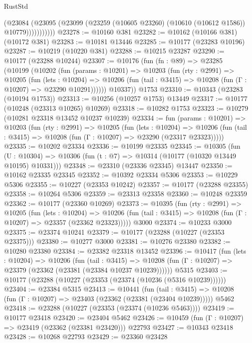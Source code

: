 \begin{lexlean}{RustStd}
\begin{coremodule}
                  (@23084
                    (@23095
                      (@23099 (@23259 (@10605 @23260) (@10610 (@10612 @1586)) @10779)))))))))))
@23278 := @10160 @381
@23282 := @10162 (@10166 @381) (@10172 @381)
@23283 := @10181 @13446
@23285 := @10177 (@23283 @10196)
@23287 := @10219 (@10220 @381)
@23288 := @10215 @23287
@23290 := @10177 (@23288 @10244)
@23307 := @10176
    (fun (fn : @89) =>
    @23285
      (@10199
        (@10202
          (fun (params : @10201) =>
          @10203
            (fun (rty : @2991) =>
            @10205
              (fun (lets : @10204) =>
              @10206 (fun (tail : @3415) => @10208 (fun (Γ : @10207) => @23290 @10291))))))
        @10337))
    @1753
@23310 := @10343 (@23283 (@10194 @1753))
@23313 := @10256 (@10257 @1753) @13449
@23317 := @10177 (@10248 (@23313 @10265) @10269)
@23318 := @10282 @1753
@23323 := @10279 (@10281 @23318 @13452 @10237 @10239)
@23334 := fun (params : @10201) =>
  @10203
    (fun (rty : @2991) =>
    @10205
      (fun (lets : @10204) =>
      @10206 (fun (tail : @3415) => @10208 (fun (Γ : @10207) => @23290 (@23317 @23323)))))
@23335 := @10202 @23334
@23336 := @10199 @23335
@23345 := @10305
    (fun (U : @10304) => @10306 (fun (t : @7) => @10314 (@10177 (@10320 @13449 @10195) @10331)))
@23348 := @23310 (@23336 @23345) @13447
@23350 := @10162 @23335 @23345
@23352 := @10392 @23334 @5306
@23353 := @10229 @5306
@23355 := @10227 (@23353 @10242)
@23357 := @10177 (@23288 @23355)
@23358 := @10264 @5306
@23359 := @23313 @23358
@23360 := @10248 @23359
@23362 := @10177 (@23360 @10269)
@23373 := @10395
    (fun (rty : @2991) =>
    @10205
      (fun (lets : @10204) =>
      @10206 (fun (tail : @3415) => @10208 (fun (Γ : @10207) => @23357 (@23362 @23323)))))
    @3000
@23374 := @10233 @3000
@23375 := @23374 @10241
@23379 := @10177 (@23288 (@10227 (@23353 @23375)))
@23380 := @10277 @3000
@23381 := @10276 @23380
@23382 := @10280 @23380
@23384 := @23382 @23318 @13452
@23396 := @10417
    (fun (lets : @10204) =>
    @10206
      (fun (tail : @3415) =>
      @10208 (fun (Γ : @10207) => @23379 (@23362 (@23381 (@23384 @10237 @10239))))))
    @5315
@23403 := @10177 (@23288 (@10227 (@23353 (@23374 (@10236 (@5316 @10239))))))
@23404 := @23384 @5315
@23413 := @10441
    (fun (tail : @3415) => @10208 (fun (Γ : @10207) => @23403 (@23362 (@23381 (@23404 @10239)))))
    @5462
@23418 := @23288 (@10227 (@23353 (@23374 (@10236 @5463))))
@23419 := @10177 @23418
@23420 := @23404 @5462
@23426 := @10459 (fun (Γ : @10207) => @23419 (@23362 (@23381 @23420))) @22793
@23427 := @10343 @23418
@23428 := @10268 @22793
@23429 := @23360 @23428

\end{coremodule}
\end{lexlean}
